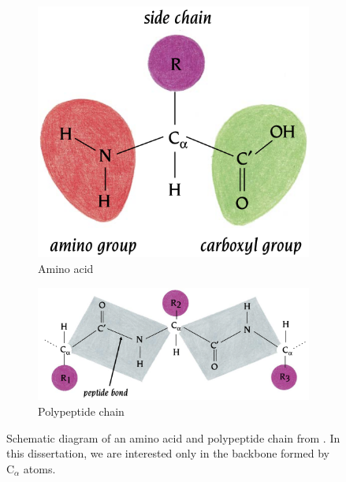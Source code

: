 \documentclass[a4paper,12pt]{article}
\begin{document}
\begin{figure}[htbp]
    \centering
    \begin{subfigure}[b]{0.4\textwidth}
        \centering
        \includegraphics[width=\linewidth]{amino_acid.png}
        \caption{Amino acid}
        \label{fig:amino_acid}
    \end{subfigure}
    \begin{subfigure}[b]{0.75\textwidth}
        \centering
        \includegraphics[width=\textwidth]{polypeptide_chain.png}
        \caption{Polypeptide chain}
        \label{fig:polypeptide_chain}
    \end{subfigure}
    \caption{Schematic diagram of an amino acid and polypeptide chain from \citet{branden2012IntroductionProteinStructure}. In this dissertation, we are interested only in the backbone formed by C\(_\alpha\) atoms.}
    \label{fig:amino_acid_and_polypeptide_chain}
\end{figure}
\end{document}
